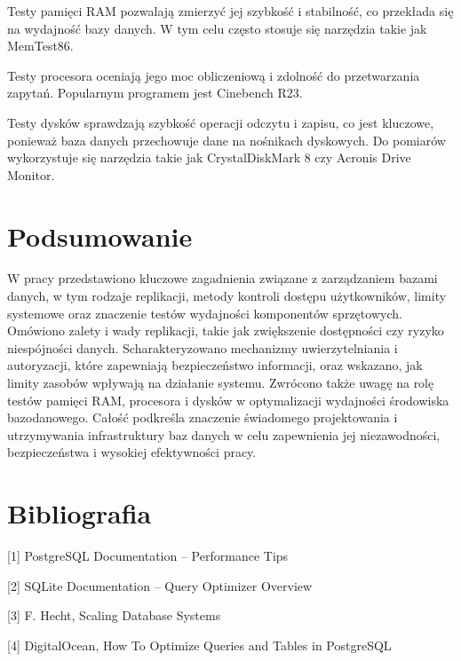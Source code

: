 \documentclass[a4paper,11pt,polish]{sphinxmanual}
\begin{document}
\sphinxAtStartPar
Testy pamięci RAM pozwalają zmierzyć jej szybkość i stabilność, co przekłada się na wydajność bazy danych. W tym celu często stosuje się narzędzia takie jak MemTest86.

\sphinxAtStartPar
Testy procesora oceniają jego moc obliczeniową i zdolność do przetwarzania zapytań. Popularnym programem jest Cinebench R23.

\sphinxAtStartPar
Testy dysków sprawdzają szybkość operacji odczytu i zapisu, co jest kluczowe, ponieważ baza danych przechowuje dane na nośnikach dyskowych. Do pomiarów wykorzystuje się narzędzia takie jak CrystalDiskMark 8 czy Acronis Drive Monitor.


\section{Podsumowanie}
\label{\detokenize{Wydajnosc-Skalowanie-i-Replikacja/index:podsumowanie}}
\sphinxAtStartPar
W pracy przedstawiono kluczowe zagadnienia związane z zarządzaniem bazami danych, w tym rodzaje replikacji, metody kontroli dostępu użytkowników, limity systemowe oraz znaczenie testów wydajności komponentów sprzętowych. Omówiono zalety i wady replikacji, takie jak zwiększenie dostępności czy ryzyko niespójności danych. Scharakteryzowano mechanizmy uwierzytelniania i autoryzacji, które zapewniają bezpieczeństwo informacji, oraz wskazano, jak limity zasobów wpływają na działanie systemu. Zwrócono także uwagę na rolę testów pamięci RAM, procesora i dysków w optymalizacji wydajności środowiska bazodanowego. Całość podkreśla znaczenie świadomego projektowania i utrzymywania infrastruktury baz danych w celu zapewnienia jej niezawodności, bezpieczeństwa i wysokiej efektywności pracy.


\section{Bibliografia}
\label{\detokenize{Wydajnosc-Skalowanie-i-Replikacja/index:bibliografia}}
\sphinxAtStartPar
{[}1{]} PostgreSQL Documentation – Performance Tips

\sphinxAtStartPar
{[}2{]} SQLite Documentation – Query Optimizer Overview

\sphinxAtStartPar
{[}3{]} F. Hecht, Scaling Database Systems

\sphinxAtStartPar
{[}4{]} DigitalOcean, How To Optimize Queries and Tables in PostgreSQL
\end{document}
